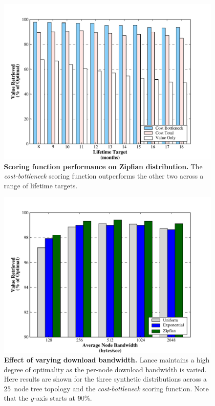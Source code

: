 \begin{figure}[t]
\begin{center}
\includegraphics[width=1.0\hsize]{./4-lance/figs/zipfian.pdf}
\end{center}

\caption{\textbf{Scoring function performance on Zipfian distribution.} The
\textit{cost-bottleneck} scoring function outperforms the other two across a
range of lifetime targets.}

\label{lance-fig-zipfian}
\end{figure}

\begin{figure}[t]
\begin{center}
\includegraphics[width=1.0\hsize]{./4-lance/figs/speeds.pdf}
\end{center}

\caption{\textbf{Effect of varying download bandwidth.} Lance maintains a
high degree of optimality as the per-node download bandwidth is varied. Here
results are shown for the three synthetic distributions across a 25~node tree
topology and the \textit{cost-bottleneck} scoring function. Note that the
$y$-axis starts at 90\%.}

\label{lance-fig-speeds}
\end{figure}


